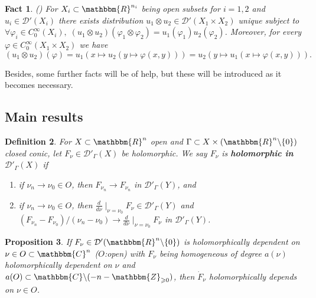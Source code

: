 \documentclass{article}
\newcommand{\tmtextbf}[1]{{\bfseries{#1}}}
\newtheorem{proposition}{Proposition}[section]
\newtheorem{definition}[proposition]{Definition}
\newtheorem{fact}[proposition]{Fact}
\theoremstyle{remark}
\begin{document}
\begin{fact}
	\label{holomorphicity-preserving:fact-tensor}({\cite[thm.
5.1.1]{hormander1983analysis}}) For $X_i \subset \mathbbm{R}^{n_i}$ being open
subsets for $i = 1, 2$ and $u_i \in \mathcal{D}' (X_i)$ there exists
distribution $u_1 \otimes u_2 \in \mathcal{D}' (X_1 \times X_2)$ unique
subject to $\forall \varphi_i \in C^{\infty}_0 (X_i), \; (u_1 \otimes u_2)
(\varphi_1 \otimes \varphi_2) = u_1 (\varphi_1) u_2 (\varphi_2)$. Moreover,
for every $\varphi \in C_0^{\infty} (X_1 \times X_2)$ we have
\[ (u_1 \otimes u_2) (\varphi) = u_1 (x \mapsto u_2 (y \mapsto \varphi (x,
   y))) = u_2 (y \mapsto u_1 (x \mapsto \varphi (x, y))) .
\]
\end{fact}

Besides, some further facts will be of help, but these will be introduced as
it becomes necessary.

\subsection{Main results}

\begin{definition}
  \label{holomorphicity-preserving:def-holo-in-DG}For $X \subset
  \mathbbm{R}^n$ open and $\Gamma \subset X \times (\mathbbm{R}^n \backslash
  \{ 0 \})$ closed conic, let $F_{\nu} \in \mathcal{D}'_{\Gamma} (X)$ be
  holomorphic. We say $F_{\nu}$ is \tmtextbf{holomorphic in
  $\mathcal{D}'_{\Gamma} (X)$} if
  \begin{enumerate}
    \item if $\nu_n \rightarrow \nu_0 \in O$, then $F_{\nu_n} \rightarrow
    F_{\nu_n}$ in $\mathcal{D}'_{\Gamma} (Y)$, and
    
    \item if $\nu_n \rightarrow \nu_0 \in O$, then $\frac{d}{d \nu}
    \mid_{\nu = \nu_0} F_{\nu} \in \mathcal{D}'_{\Gamma} (Y)$ and
    $(F_{\nu_n} - F_{\nu_0}) / (\nu_n - \nu_0) \rightarrow \frac{d}{d \nu}
    \mid_{\nu = \nu_0} F_{\nu}$ in $\mathcal{D}'_{\Gamma} (Y)$.
  \end{enumerate}
\end{definition}

\begin{proposition}
  \label{holomorphicity-preserving:prop-homog-holo}If $F_{\nu} \in
  \mathcal{D}' (\mathbbm{R}^n \backslash \{ 0 \})$ is holomorphically
  dependent on $\nu \in O \subset \mathbbm{C}^n$ ($O$:open) with $F_{\nu}$
  being homogeneous of degree $a (\nu)$ holomorphically dependent on $\nu$ and
  $a (O) \subset \mathbbm{C}\backslash (- n -\mathbbm{Z}_{\geqslant 0})$, then
  $\dot{F}_{\nu}$ holomorphically depends on $\nu \in O$.
\end{proposition}
\end{document}
